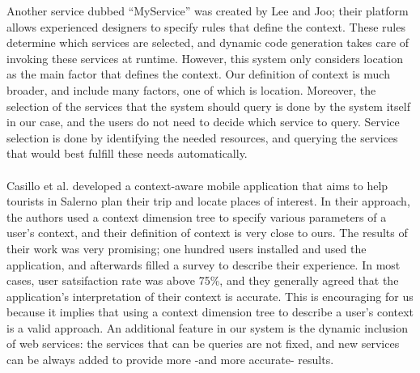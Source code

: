 Another service dubbed ``MyService'' was created by Lee and Joo\cite{myservice}; their platform allows experienced designers to specify rules that define the context. These rules determine which services are selected, and dynamic code generation takes care of invoking these services at runtime. However, this system only considers location as the main factor that defines the context. Our definition of context is much broader, and include many factors, one of which is location. Moreover, the selection of the services that the system should query is done by the system itself in our case, and the users do not need to decide which service to query. Service selection is done by identifying the needed resources, and querying the services that would best fulfill these needs automatically.\\\\
Casillo et al.\cite{casillo} developed a context-aware mobile application that aims to help tourists in Salerno plan their trip and locate places of interest. In their approach, the authors used a context dimension tree to specify various parameters of a user's context, and their definition of context is very close to ours. The results of their work was very promising; one hundred users installed and used the application, and afterwards filled a survey to describe their experience. In most cases, user satsifaction rate was above 75\%, and they generally agreed that the application's interpretation of their context is accurate. This is encouraging for us because it implies that using a context dimension tree to describe a user's context is a valid approach. An additional feature in our system is the dynamic inclusion of web services: the services that can be queries are not fixed, and new services can be always added to provide more -and more accurate- results.\\\\
